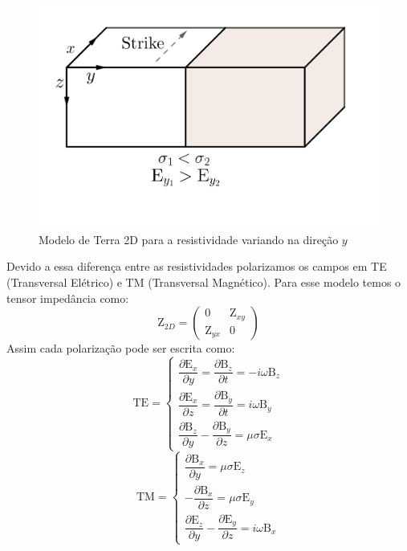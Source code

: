 	    \begin{figure}[H]
	        \caption{Modelo de Terra 2D para a resistividade variando na direção $y$}
	        \begin{center}
	        \includegraphics[width=12cm]{texto/fig/Tm_Te.png} 
	        \end{center}
		\label{fig_strike}
	    \end{figure}
	    Devido a essa diferença entre as resistividades polarizamos os campos em TE (Transversal Elétrico) e TM (Transversal Magnético).
	    Para esse modelo temos o tensor impedância como:
	    \begin{equation}
	     \textrm{Z}_{2D} = \left (\begin{array}{cc}
	                               0 & \textrm{Z}_{xy} \\
	                               \textrm{Z}_{yx} & 0
	                              \end{array} \right)
	    \end{equation}
	    Assim cada polarização pode ser escrita como:
	    \begin{equation}
	     \textrm{TE} = \left \{ \begin{array}{l}
	            \dfrac{\partial \textrm{E}_x}{\partial y} = \dfrac{\partial \textrm{B}_z}{\partial t} = -i\omega \textrm{B}_z \\
	           \dfrac{\partial \textrm{E}_x}{\partial z} = \dfrac{\partial \textrm{B}_y}{\partial t} = i\omega \textrm{B}_y \\
	           \dfrac{\partial \textrm{B}_z}{\partial y} - \dfrac{\partial \textrm{B}_y}{\partial z} = \mu \sigma \textrm{E}_x 
	           \end{array} \right.
	    \end{equation}
	    \begin{equation}
	     \textrm{TM} = \left \{ \begin{array}{l}
	            \dfrac{\partial \textrm{B}_x}{\partial y} = \mu \sigma \textrm{E}_z \\
	           -\dfrac{\partial \textrm{B}_x}{\partial z} = \mu \sigma \textrm{E}_y \\
	           \dfrac{\partial \textrm{E}_z}{\partial y} - \dfrac{\partial \textrm{E}_y}{\partial z} = i \omega \textrm{B}_x 
	           \end{array} \right.
	    \end{equation}
        
